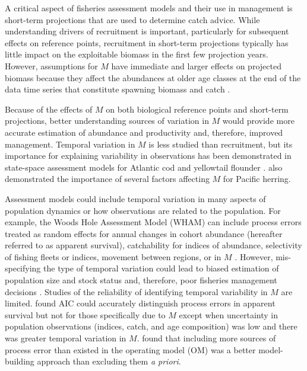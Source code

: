 \documentclass[
  12pt,
]{article}
\begin{document}
A critical aspect of fisheries assessment models and their use in management is short-term projections that are used to determine catch advice. While understanding drivers of recruitment is important, particularly for subsequent effects on reference points, recruitment in short-term projections typically has little impact on the exploitable biomass in the first few projection years. However, assumptions for \(M\) have immediate and larger effects on projected biomass because they affect the abundances at older age classes at the end of the data time series that constitute spawning biomass and catch \citep{brodziaketal08, stocketal21}.

Because of the effects of \(M\) on both biological reference points and short-term projections, better understanding sources of variation in \(M\) would provide more accurate estimation of abundance and productivity and, therefore, improved management. Temporal variation in \(M\) is less studied than recruitment, but its importance for explaining variability in observations has been demonstrated in state-space assessment models for Atlantic cod and yellowtail flounder \citep{cadigan16, stocketal21}. \citet{derisoetal08} also demonstrated the importance of several factors affecting \(M\) for Pacific herring.

Assessment models could include temporal variation in many aspects of population dynamics or how observations are related to the population. For example, the Woods Hole Assessment Model (WHAM) can include process errors treated as random effects for annual changes in cohort abundance (hereafter referred to as apparent survival), catchability for indices of abundance, selectivity of fishing fleets or indices, movement between regions, or in \(M\) \citep{stockmiller21, milleretal25}. However, mis-specifying the type of temporal variation could lead to biased estimation of population size and stock status and, therefore, poor fisheries management decisions \citep{legaultpalmer16, szuwalskietal18}. Studies of the reliability of identifying temporal variability in \(M\) are limited. \citet{milleretal_inreview1} found AIC could accurately distinguish process errors in apparent survival but not for those specifically due to \(M\) except when uncertainty in population observations (indices, catch, and age composition) was low and there was greater temporal variation in \(M\). \citet{lietal24} found that including more sources of process error than existed in the operating model (OM) was a better model-building approach than excluding them \textit{a priori}.
\end{document}
